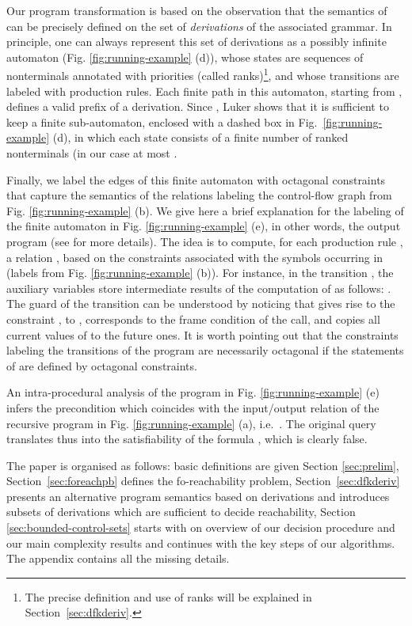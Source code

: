 \documentclass[final]{llncs}
\begin{document}
Our program transformation is based on the observation that the semantics of
 can be precisely defined on the set of \emph{derivations} of
the associated grammar. In principle, one can always represent this set of
derivations as a possibly infinite automaton (Fig. \ref{fig:running-example}
(d)), whose states are sequences of nonterminals annotated with priorities
(called ranks)\footnote{The precise definition and use of ranks will be
explained in Section~\ref{sec:dfkderiv}.}, and whose transitions are labeled
with production rules. Each finite path in this automaton, starting from
, defines a valid prefix of a derivation. Since , Luker \cite{Luker78} shows that it is sufficient to keep a finite
sub-automaton, enclosed with a dashed box in Fig.~\ref{fig:running-example} (d),
in which each state consists of a finite number of ranked nonterminals (in our
case at most .

Finally, we label the edges of this finite automaton with octagonal
constraints that capture the semantics of the relations labeling the
control-flow graph from Fig. \ref{fig:running-example} (b). We give
here a brief explanation for the labeling of the finite automaton in
Fig. \ref{fig:running-example} (e), in other words, the output
program  (see \cite{gik13} for more details). The idea
is to compute, for each production rule , a relation
, based on the constraints associated
with the symbols occurring in  (labels from
Fig. \ref{fig:running-example} (b)). For instance, in the transition
, the auxiliary variables store
intermediate results of the computation of  as
follows: . The guard of the transition can be understood by
noticing that  gives rise to the constraint
,  to , 
corresponds to the frame condition of the call, and 
copies all current values of  to the future ones.
It is worth pointing out that the constraints labeling the transitions
of the program  are necessarily octagonal if the
statements of  are defined by octagonal constraints.

An intra-procedural analysis of the program  in
Fig. \ref{fig:running-example} (e) infers the precondition
 which coincides with the input/output
relation of the recursive program  in
Fig. \ref{fig:running-example} (a), i.e.\ . The
original query  translates
thus into the satisfiability of the formula , which is clearly false.

The paper is organised as follows: basic definitions are given Section \ref{sec:prelim},
Section~\ref{sec:foreachpb} defines the fo-reachability problem, 
Section~\ref{sec:dfkderiv} presents an alternative program semantics based on derivations
and introduces subsets of derivations which are sufficient to decide reachability,
Section \ref{sec:bounded-control-sets} starts with on overview of our decision
procedure and our main complexity results and continues with the key steps of our algorithms. 
The appendix contains all the missing details.
\end{document}
